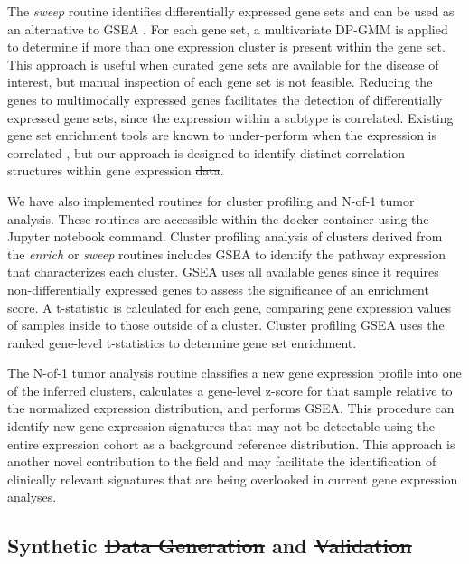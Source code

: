 \documentclass[10pt,letterpaper]{article}
\providecommand{\DIFaddtex}[1]{{\protect\color{blue}\uwave{#1}}} %
\providecommand{\DIFdeltex}[1]{{\protect\color{red}\sout{#1}}}                      %
\providecommand{\DIFaddbegin}{} %
\providecommand{\DIFaddend}{} %
\providecommand{\DIFdelbegin}{} %
\providecommand{\DIFdelend}{} %
\providecommand{\DIFadd}[1]{\texorpdfstring{\DIFaddtex{#1}}{#1}} %
\providecommand{\DIFdel}[1]{\texorpdfstring{\DIFdeltex{#1}}{}} %
\newcommand{\DIFscaledelfig}{0.5}
\newlength{\DIFdelgraphicswidth} %
\newlength{\DIFdelgraphicsheight} %
\newcommand{\DIFaddincludegraphics}[2][]{{\color{blue}\fbox{\DIFOincludegraphics[#1]{#2}}}} %
\newcommand{\DIFdelincludegraphics}[2][]{%
\sbox{\DIFdelgraphicsbox}{\DIFOincludegraphics[#1]{#2}}%
\settoboxwidth{\DIFdelgraphicswidth}{\DIFdelgraphicsbox} %
\settoboxtotalheight{\DIFdelgraphicsheight}{\DIFdelgraphicsbox} %
\scalebox{\DIFscaledelfig}{%
\parbox[b]{\DIFdelgraphicswidth}{\usebox{\DIFdelgraphicsbox}\\[-\baselineskip] \rule{\DIFdelgraphicswidth}{0em}}\llap{\resizebox{\DIFdelgraphicswidth}{\DIFdelgraphicsheight}{%
\setlength{\unitlength}{\DIFdelgraphicswidth}%
\begin{picture}(1,1)%
\thicklines\linethickness{2pt} %
{\color[rgb]{1,0,0}\put(0,0){\framebox(1,1){}}}%
{\color[rgb]{1,0,0}\put(0,0){\line( 1,1){1}}}%
{\color[rgb]{1,0,0}\put(0,1){\line(1,-1){1}}}%
\end{picture}%
}\hspace*{3pt}}} %
} %
\DeclareRobustCommand{\DIFaddbegin}{\DIFOaddbegin \let\includegraphics\DIFaddincludegraphics} %
\DeclareRobustCommand{\DIFaddend}{\DIFOaddend \let\includegraphics\DIFOincludegraphics} %
\DeclareRobustCommand{\DIFdelbegin}{\DIFOdelbegin \let\includegraphics\DIFdelincludegraphics} %
\DeclareRobustCommand{\DIFdelend}{\DIFOaddend \let\includegraphics\DIFOincludegraphics} %
\begin{document}
The \textit{sweep} routine identifies differentially expressed gene sets and can be used as an alternative to GSEA \cite{subramanianGeneSetEnrichment2005}. For each gene set, a multivariate DP-GMM is applied to determine if more than one expression cluster is present within the gene set. This approach is useful when curated gene sets are available for the disease of interest, but manual inspection of each gene set is not feasible. Reducing the genes to multimodally expressed genes facilitates the detection of differentially expressed gene sets\DIFdelbegin \DIFdel{, since the expression within a subtype is correlated}\DIFdelend . Existing gene set enrichment tools are known to under-perform when the expression is correlated \cite{tamayoLimitationsSimpleGene2016}, but our approach is designed to identify distinct correlation structures within gene expression \DIFdelbegin \DIFdel{data}\DIFdelend \DIFaddbegin \DIFadd{datasets}\DIFaddend . 

We have also implemented routines for cluster profiling and N-of-1 tumor analysis. These routines are accessible within the docker container using the Jupyter notebook command. Cluster profiling analysis of clusters derived from the \textit{enrich} or \textit{sweep} routines includes GSEA \cite{korotkevichFastGeneSet2019} to identify the pathway expression that characterizes each cluster. GSEA uses all available genes since it requires non-differentially expressed genes to assess the significance of an enrichment score. A t-statistic is calculated for each gene, comparing gene expression values of samples inside to those outside of a cluster. Cluster profiling GSEA uses the ranked gene-level t-statistics to determine gene set enrichment. 

The N-of-1 tumor analysis routine classifies a new gene expression profile into one of the inferred clusters, calculates a gene-level z-score for that sample relative to the normalized expression distribution, and performs GSEA. This procedure can identify new gene expression signatures that may not be detectable using the entire expression cohort as a background reference distribution. This approach is another novel contribution to the field and may facilitate the identification of clinically relevant signatures that are being overlooked in current gene expression analyses.

\subsection*{Synthetic \DIFdelbegin \DIFdel{Data Generation }\DIFdelend \DIFaddbegin \DIFadd{data generation }\DIFaddend and \DIFdelbegin \DIFdel{Validation}\DIFdelend \DIFaddbegin \DIFadd{validation}\DIFaddend }
\DIFdelbegin %
\end{document}

